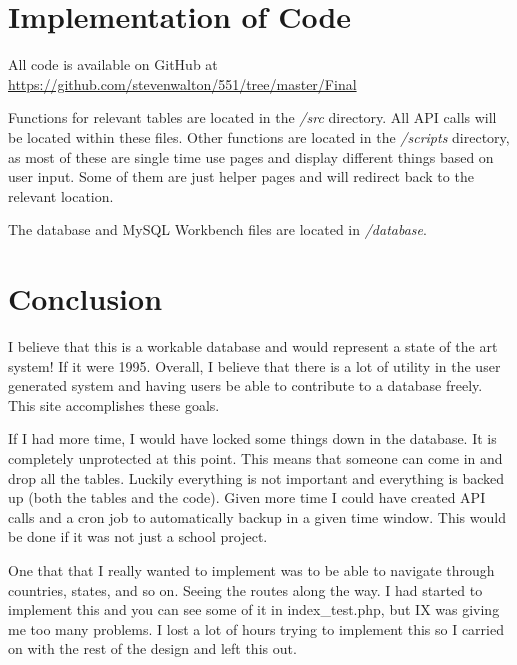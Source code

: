 \documentclass[12pt,letter]{article}
\begin{document}
\section{Implementation of Code}\label{sec:imp}
All code is available on GitHub at
\href{https://github.com/stevenwalton/551/tree/master/Final}{https://github.com/stevenwalton/551/tree/master/Final}

Functions for relevant tables are located in the \textit{/src} directory. All
API calls will be located within these files. Other
functions are located in the \textit{/scripts} directory, as most of these are
single time use pages and display different things based on user input. Some of
them are just helper pages and will redirect back to the relevant location.

The database and MySQL Workbench files are located in \textit{/database}.

\section{Conclusion}\label{sec:con}
I believe that this is a workable database and would represent a state of the
art system! If it were 1995. Overall, I believe that there is a lot of utility
in the user generated system and having users be able to contribute to a
database freely. This site accomplishes these goals.

If I had more time, I would have locked some things down in the database. It is
completely unprotected at this point. This means that someone can come in and
drop all the tables. Luckily everything is not important and everything is
backed up (both the tables and the code). Given more time I could have created
API calls and a cron job to automatically backup in a given time window. This
would be done if it was not just a school project. 

One that that I really wanted to implement was to be able to navigate through
countries, states, and so on. Seeing the routes along the way. I had started to
implement this and you can see some of it in index\_test.php, but IX was giving
me too many problems. I lost a lot of hours trying to implement this so I
carried on with the rest of the design and left this out.
\end{document}
